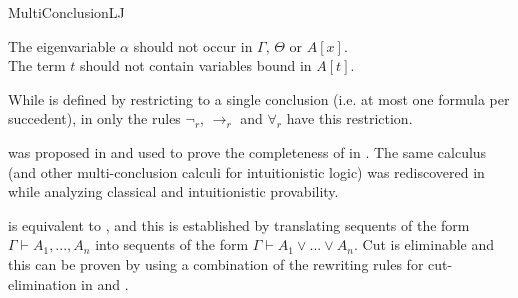 \begin{entry}{MultiConclusionLJ}
\begin{calculus}
\centering
The eigenvariable $\alpha$ should not occur in $\Gamma$, $\Theta$ or $A[x]$. \\ 
The term $t$ should not contain variables bound in $A[t]$.
\end{calculus}


\begin{clarifications}
While \LJ {} is defined by restricting \LK {} to a single conclusion 
(i.e. at most one formula per succedent), in \LJmc only the rules 
$\neg_r$, $\rightarrow_r$ and $\forall_r$ have this
restriction.
\end{clarifications}

\begin{history}
\LJmc was proposed in \cite{Maehara1954} and used to prove the completeness of
\LJ {} in \cite{Takeuti1987}. The same calculus (and other
multi-conclusion calculi for intuitionistic logic) was rediscovered in
\cite{Nadathur1998} while analyzing classical and intuitionistic provability.
\end{history}

\begin{technicalities}
\LJmc is equivalent to \LJ, and this is established by translating
sequents of the form $\Gamma \vdash A_1, ..., A_n$ into 
sequents of the form $\Gamma \vdash A_1 \vee ... \vee A_n$. 
Cut is eliminable and this can be proven by using a combination of the rewriting
rules for cut-elimination in \LJ and \LK.
\end{technicalities}

\end{entry}
